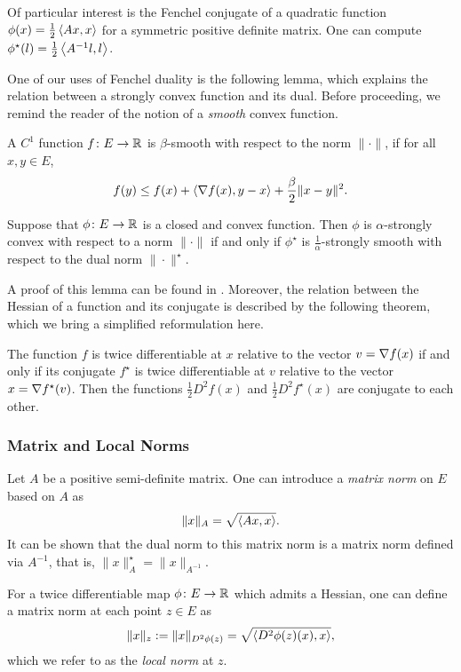 Of particular interest is the Fenchel conjugate of a quadratic function $\phi(x) = \frac{1}{2}\left\langle Ax,x \right\rangle$ for a symmetric positive definite matrix. One can compute $\phi^\star(l) = \frac{1}{2}\left\langle A^{-1}l,l \right\rangle$. 

One of our uses of Fenchel duality is the following lemma, which explains the relation between a strongly convex function and its dual. Before proceeding, we remind the reader of the notion of a \emph{smooth} convex function.
\begin{definition}
    A $C^1$ function $f \colon E\to \mathbb{R}$ is $\beta$-smooth with respect to the norm $\|\cdot\|$, if for all $x,y\in E$,
    \[
        f(y) \leq f(x) + \left\langle \nabla f(x),y-x \right\rangle + \frac{\beta}{2}\|x-y\|^2.
    \]
\end{definition}
\begin{lemma} \label{lem:strongsmoothdual}
    Suppose that $\phi \colon E\to \mathbb{R}$ is a closed and convex function. Then $\phi$ is $\alpha$-strongly convex with respect to a norm $\|\cdot\|$ if and only if $\phi^\star$ is $\frac{1}{\alpha}$-strongly smooth with respect to the dual norm $\|\cdot\|^\star$.
\end{lemma}
A proof of this lemma can be found in \citet{zalinescu2002convex}. Moreover, the relation between the Hessian of a function and its conjugate is described by the following theorem, which we bring a simplified reformulation here.
\begin{theorem}\label{thm:rock}
    The function $f$ is twice differentiable at $x$ relative to the vector $v = \nabla f(x)$ if and only if its conjugate $f^\star$ is twice differentiable at $v$ relative to the vector $x = \nabla f^\star(v)$. Then the functions
    $\frac{1}{2} D^2 f(x)$ and $\frac{1}{2} D^2 f^\star(x)$  are conjugate to each other.
\end{theorem}

\subsubsection*{Matrix and Local Norms}
Let $A$ be a positive semi-definite matrix. One can introduce a \emph{matrix norm} on $E$ based on $A$ as
\[
    \|x\|_A = \sqrt{\left\langle Ax,x \right\rangle}.
\]
It can be shown that the dual norm to this matrix norm is a matrix norm defined via $A^{-1}$, that is, $\|x\|_{A}^\star = \|x\|_{A^{-1}}$.

For a twice differentiable map $\phi\colon E \to \mathbb{R}$ which admits a Hessian, one can define a matrix norm at each point $z\in E$ as
\[
    \|x\|_z := \|x\|_{D^2\phi(z)} = \sqrt{\left\langle D^2\phi(z)(x),x \right\rangle},
\]
which we refer to as the \emph{local norm} at $z$.

